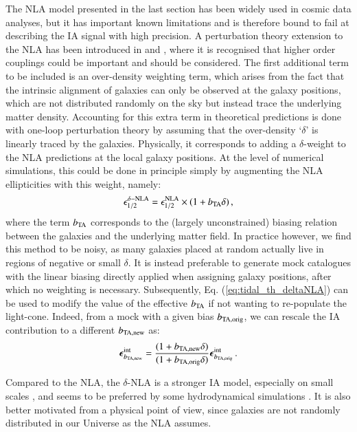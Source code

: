 \documentclass[useAMS,usenatbib]{mn2e}
\begin{document}
The NLA model presented in the last section has been widely used in cosmic data analyses, but it has important known limitations and is therefore bound to fail at describing the IA signal with high precision.
A perturbation theory extension to the NLA has been introduced in \citet{Blazek2015} and  \citet{Blazek2019},  where it is recognised that higher order couplings could be important and should be considered. The first additional term to be included is an over-density weighting term, which arises from the fact that  the intrinsic alignment of galaxies can only be observed at the galaxy positions, which are not distributed randomly on the sky but instead trace the underlying matter density.  Accounting for this extra term in theoretical predictions is done with one-loop perturbation theory  \citep{Blazek2019} by assuming that the over-density  `$\delta$' is linearly traced by the galaxies. Physically, it corresponds to adding a $\delta$-weight to the NLA predictions at the local galaxy positions. At the level of numerical simulations, this could be done in principle simply by augmenting the NLA ellipticities with this weight, namely:
 \begin{eqnarray}
\epsilon_{1/2}^{\delta-\rm NLA} = \epsilon_{1/2}^{\rm NLA}\times(1 + b_{\rm TA}\delta) \, ,
\label{eq:tidal_th_deltaNLA}
\end{eqnarray}
where the term $b_{\rm TA}$ corresponds to the (largely unconstrained) biasing relation between the galaxies and the underlying matter field. In practice however, we find this method to be noisy, as many galaxies placed at random actually live in regions of negative or small $\delta$. It is instead preferable to generate mock catalogues with the linear biasing directly applied when assigning galaxy positions, after which no weighting is necessary. Subsequently, Eq. (\ref{eq:tidal_th_deltaNLA}) can be used to modify the value of the effective $b_{\rm TA}$ if not wanting to re-populate the light-cone. Indeed, from a mock with a given bias $b_{\rm TA, orig}$, we can rescale the IA contribution to a different $b_{\rm TA, new}$  as:
\begin{eqnarray}
{\boldsymbol \epsilon}^{\rm int}_{b_{\rm TA, new}}  = \frac{(1 + b_{\rm TA, new}\delta)}{(1 + b_{\rm TA, orig}\delta)}{\boldsymbol \epsilon}^{\rm int}_{b_{\rm TA, orig}} \, .
\label{eq:bta_rescale}
\end{eqnarray}


Compared to the NLA, the $\delta$-NLA is a stronger IA model, especially on small scales \citep{Blazek2019}, and seems to be preferred by some hydrodynamical simulations \citep{Hilbert_IA2017}. It is also better motivated from a physical point of view, since galaxies are not randomly distributed in our Universe as the NLA assumes. 
\end{document}
